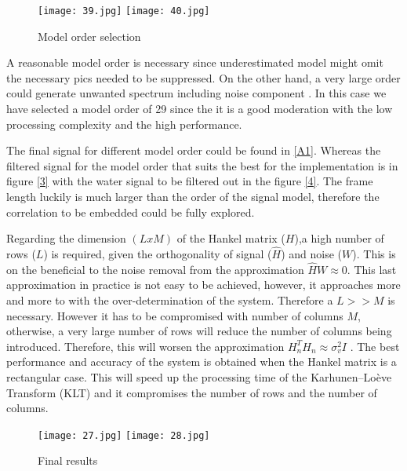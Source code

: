 \begin{figure}[!htbp]
%
\centering
\texttt{[image: 39.jpg]}
\label{3}
\endminipage\hfill
{}%
\centering
\texttt{[image: 40.jpg]}
\label{4}
\endminipage\hfill
\caption{Model order selection}\label{5}
\end{figure}

A reasonable model order is necessary since underestimated model might omit the necessary pics needed to be suppressed. On the other hand, a very large order could generate unwanted spectrum including noise component \cite{1}. In this case we have selected a model order of 29 since the it is a good moderation with the low processing complexity and the high performance.

The final signal for different model order could be found in \ref{A1}. Whereas the filtered signal for the model order that suits the best for the implementation is in figure \ref{3} with the water signal to be filtered out in the figure \ref{4}.
The frame length luckily is much larger than the order of the signal model, therefore the correlation to be embedded could be fully explored\cite{2}. 


Regarding the dimension $(LxM)$ of the Hankel matrix ($H$),a high number of rows ($L$) is required, given the orthogonality of signal ($\hat{H}$) and noise ($W$). This is on the beneficial to the noise removal from the approximation $\hat{H}W\approx 0$. This last approximation in practice is not easy to be achieved, however, it approaches more and more to with the over-determination of the system. Therefore a $L>>M$ is necessary. However it has to be compromised with number of columns $M$, otherwise, a very large number of rows will reduce the number of columns being introduced. Therefore, this will worsen the approximation $H_{n}^{T}H_{n}\approx\sigma_{v}^2I$ \cite{11}. The best performance and accuracy of the system is obtained when the Hankel matrix is a rectangular case. This will speed up the processing time of the Karhunen–Loève Transform (KLT) and it compromises the number of rows and the number of columns.


\begin{figure}[!htbp]
%
\centering
\texttt{[image: 27.jpg]}
\label{3}
\endminipage\hfill
{}%
\centering
\texttt{[image: 28.jpg]}
\label{4}
\endminipage\hfill
\caption{Final results}\label{5}
\end{figure}

